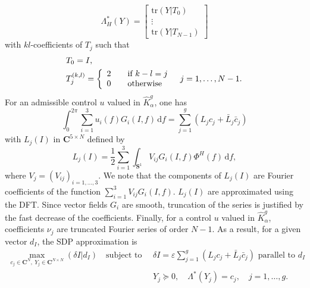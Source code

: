\documentclass[AMA,STIX1COL]{WileyNJD-v2}
\newcommand{\veps}{\varepsilon}
\newcommand{\mybar}[1]{#1}
\begin{document}
\begin{equation}
	\label{eq:Lambda}
	\Lambda^*_H(Y) = 
	\begin{bmatrix}
		\textrm{tr} \left(  Y |  T_{0} \right) \\

		\vdots \\
			\textrm{tr} \left(  Y |  T_{N-1} \right) 
	\end{bmatrix}
\end{equation}
with $kl$-coefficients of $T_j$  such that 
\begin{equation}
	\begin{aligned}
		&T_0 = I, \\
		&T_j^{ ( k,l ) } = \left\{ 
			\begin{array}{l@{\quad \quad}l}
				2 & \textrm{if} \ k-l = j \\
				0 & \textrm{otherwise}
			\end{array}
		\quad
			j = 1, \ldots, N-1.
			\right.
	\end{aligned}
\label{eq:toeplitz}
\end{equation}
%
For an admissible control $u$ valued in $\hat{K}^g_\alpha$, one has
\begin{equation}
	\label{eq:integral}
	\int_0^{2\pi} \sum_{i = 1}^3 u_i(f)G_i(\mybar{I}, f)\,\mathrm{d}f
	= \sum_{j = 1}^g \left( L_j c_j + \bar{L}_j \bar{c}_j \right) %
\end{equation}
with $L_j(\mybar{I})$ in $\mathbf{C}^{5 \times N}$ defined by
\begin{equation}
	L_j(\mybar{I}) =  \frac{1}{2}\sum_{i = 1}^3 \int_{\mathbf{S}^1} V_{ij} G_i(\mybar{I},f) \Phi^H(f) \, \mathrm{d}f,
\end{equation}
where $V_j=(V_{ij})_{i=1,\dots,3}$. We note that the components of $L_j(\mybar{I})$ are Fourier coefficients of the function $\sum_{i = 1}^3 V_{ij} G_i(\mybar{I},f)$. $L_j(\mybar{I})$ are approximated using the \ac{DFT}. Since vector fields $G_i$ are smooth, truncation of the series is justified by the fast decrease of the coefficients.
Finally, for a control $u$ valued in $\hat{K}^g_\alpha$, coefficients $\nu_j$ are truncated Fourier series of order $N-1$.
%
As a result, for a given vector $d_I$, the SDP approximation is
\begin{equation}
	\label{eq:max_pb_discrete}
	\begin{aligned}
		\max_{c_j \in \mathbf{C}^N,\ Y_j \in \mathbf{C}^{N \times N}} (\delta I|d_I) \quad
		\text{subject to}
		\quad & \delta I = \veps \sum_{j = 1}^g \left( L_j c_j + \bar{L}_j \bar{c}_j \right)
		\text{ parallel to } d_I\\
		& Y_j \succeq 0,\quad \Lambda^* \left( Y_j \right) = c_j,\quad j = 1, \ldots, g.
	\end{aligned}
\end{equation}
\end{document}
